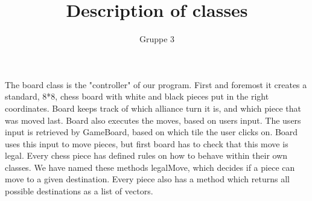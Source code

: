 \documentclass{article}
\begin{document}
\title{Description of classes}
\author{Gruppe 3}

\maketitle


\raggedright

The board class is the "controller" of our program. First and foremost it creates a standard, 8*8, chess board with white and black pieces put in the right coordinates. Board keeps track of which alliance turn it is, and which piece that was moved last. Board also executes the moves, based on users input. The users input is retrieved by GameBoard, based on which tile the user clicks on. Board uses this input to move pieces, but first board has to check that this move is legal. Every chess piece has defined rules on how to behave within their own classes. We have named these methods legalMove, which decides if a piece can move to a given destination. Every piece also has a method which returns all possible destinations as a list of vectors. \newline 
\end{document}
